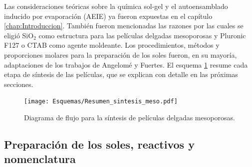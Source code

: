 	 Las consideraciones teóricas sobre la química sol-gel y el autoensamblado inducido por evaporación (AEIE) ya fueron expuestas en el capítulo \ref{chap:Introduccion}. También fueron mencionadas las razones por las cuales se eligió SiO$_2$ como estructura para las películas delgadas mesoporosas y Pluronic F127 o CTAB como agente moldeante. Los procedimientos, métodos y proporciones molares para la preparación de los soles fueron, en su mayoría, adaptaciones de los trabajos de Angelomé\cite{Angelome2008} y Fuertes\cite{Fuertes2009}. El esquema \ref{esq:peliculas_meso} resume cada etapa de síntesis de las películas, que se explican con detalle en las próximas secciones.
		  \begin{figure}[ht]
			  \begin{center}
			  \texttt{[image: Esquemas/Resumen\_sintesis\_meso.pdf]}
			  \caption[Síntesis de películas delgadas mesoporosas]{Diagrama de flujo para la síntesis de películas delgadas mesoporosas.}
			  \label{esq:peliculas_meso}
			  \end{center}
			  \end{figure}
			  \vspace*{-0.2cm}

	\subsection{Preparación de los soles, reactivos y nomenclatura}\label{sec:soles}
		
